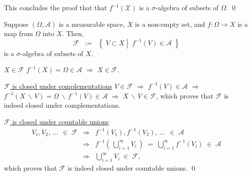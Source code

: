 \vskip 0.3cm
\noindent
This concludes the proof that that $f^{-1}\!\left(\mathcal{X}\right)$ is a $\sigma$-algebra of
subsets of $\Omega$.
\qed

\begin{lemma}
\label{PushforwardsPreserveSigmaAlgebras}
\mbox{}\vskip 0.1cm
\noindent
Suppose $\left(\Omega,\mathcal{A}\right)$ is a measurable space,
$X$ is a non-empty set, and $f : \Omega \longrightarrow X$
is a map from $\Omega$ into $X$. Then,
\begin{equation*}
\mathcal{F}
\;\; := \;\;
\left\{\;
V \subset X
\;\left\vert\;\;
f^{-1}\left(V\right) \in \mathcal{A}
\right.
\;\right\}
\end{equation*}
is a $\sigma$-algebra of subsets of $X$.
\end{lemma}
\proof
\vskip 0.1cm
\noindent
\underline{$X \in \mathcal{F}$}\quad
$f^{-1}(X) = \Omega \in \mathcal{A}$ \;$\Longrightarrow$\; $X \in \mathcal{F}$.

\vskip 0.5cm
\noindent
\underline{$\mathcal{F}$ is closed under complementations}\quad
$V \in \mathcal{F}$
\;$\Longrightarrow$\; $f^{-1}(V)\in\mathcal{A}$
\;$\Longrightarrow$\; $f^{-1}(X\,\backslash\,V) = \Omega\,\backslash\,f^{-1}(V) \in \mathcal{A}$
\;$\Longrightarrow$\; $X\,\backslash\,V \in \mathcal{F}$,
which proves that $\mathcal{F}$ is indeed closed under complementations. 

\vskip 0.5cm
\noindent
\underline{$\mathcal{F}$ is closed under countable unions}\quad
\begin{eqnarray*}
V_{1}, V_{2}, \,\ldots\, \;\in\; \mathcal{F}
&\Longrightarrow&
	f^{-1}(V_{1}), f^{-1}(V_{2}), \,\ldots\, \;\in\; \mathcal{A}
\\
&\Longrightarrow&
	f^{-1}\!\left(\,\bigcup_{i=1}^{\infty}V_{i}\,\right) \;=\; \bigcup_{i=1}^{\infty}f^{-1}\!\left(V_{i}\right) \;\in\; \mathcal{A}
\\
&\Longrightarrow&
	\bigcup_{i=1}^{\infty}V_{i} \;\in\; \mathcal{F},
\end{eqnarray*}
which proves that $\mathcal{F}$ is indeed closed under countable unions.
\qed

